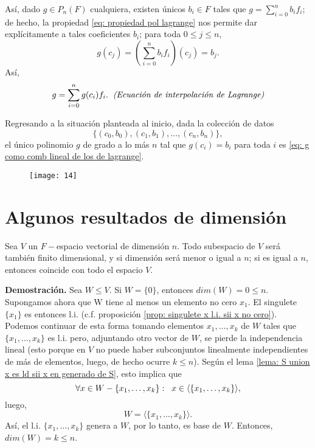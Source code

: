 \QEDB
\vspace{0.2cm}


Así, dado $g \in P_{n}(F)$ cualquiera, existen únicos
$b_{i} \in F$ tales que $g = \sum_{i = 0}^{n}b_{i}f_{i}$;
de hecho, la propiedad \eqref{eq: propiedad pol lagrange}
nos permite dar explícitamente a tales coeficientes $b_{i}$;
para toda $0 \leq j \leq n$,
\[
g(c_{j}) = \left( \sum_{i = 0}^{n}b_{i}f_{i} \right)(c_{j})
= b_{j}.
\]
Así,
\begin{equation}
	\label{eq: g como comb lineal de los de lagrange}
	g = \sum_{i=0}^{n}g(c_{i})f_{i}.
	\hspace{0.2cm} \textit{(Ecuación de interpolación de Lagrange)}
\end{equation}


Regresando a la situación planteada al inicio,
dada la colección de datos 
$$\{ (c_{0}, b_{0}), (c_{1}, b_{1}), \ldots , (c_{n}, b_{n}) \},$$
el único polinomio $g$ de grado a lo más $n$ tal que
$g(c_{i}) = b_{i}$ para toda $i$ es 
\eqref{eq: g como comb lineal de los de lagrange}.

\begin{figure}[H]
	\centering
	\texttt{[image: 14]} 
\end{figure}	




\section{Algunos resultados de dimensión}

\begin{teo}
	\label{teo: la dim de subespacios es menor o igual a la del espacio}
Sea $V$ un $F-$espacio vectorial de dimensión $n$.
Todo subespacio de $V$ será también finito dimensional, y
si dimensión será menor o igual a $n$; si es igual a $n$,
entonces coincide con todo el espacio $V$.
\end{teo}
\noindent
\textbf{Demostración.}
Sea $W \leq V$.
Si $W = \{ 0 \}$, entonces $dim(W) = 0 \leq n$. Supongamos ahora
que W tiene al menos un elemento no cero $x_{1}$.
El singulete
$\{ x_{1} \}$ es entonces l.i.
(c.f. proposición \ref{prop: singulete x l.i. sii x no cero}).
Podemos continuar de esta forma tomando elementos
$x_{1}, \ldots, x_{k}$ de $W$
tales que $\{ x_{1}, \ldots , x_{k} \}$ es l.i.
pero, adjuntando otro vector de $W$, se pierde la independencia
lineal (esto porque en $V$ no puede haber subconjuntos linealmente
independientes de más de elementos, luego, de hecho
ocurre $k \leq n$).
Según el lema 
\ref{lema: S union x es ld sii x en generado de S}, esto implica
que
\[
\forall x \in W - \{ x_{1}, \ldots , x_{k} \}:
\hspace{0.2cm} x \in \langle \{ x_{1}, \ldots , x_{k} \} \rangle,
\]
luego, 
\[
W = \langle \{ x_{1}, \ldots , x_{k} \} \rangle.
\]
Así, el l.i. $\{ x_{1}, \ldots , x_{k} \}$
genera a $W$, por lo tanto, es base de $W$.
Entonces, $dim (W) = k \leq n$.


